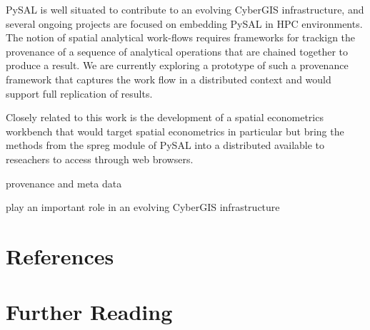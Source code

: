 \documentclass[11pt, titlepage]{article}
\begin{document}
PySAL is well situated to contribute to an evolving CyberGIS
infrastructure, and several ongoing projects are focused on embedding
PySAL in HPC environments. The notion of spatial analytical work-flows
requires frameworks for trackign the provenance of a sequence of
analytical operations that are chained together to produce a result. We
are currently exploring a prototype of such a provenance framework that
captures the work flow in a distributed context and would support full
replication of results.

Closely related to this work is the development of a spatial
econometrics workbench that would target spatial econometrics in
particular but bring the methods from the spreg module of PySAL into a
distributed available to reseachers to access through web browsers.

provenance and meta data

play an important role in an evolving CyberGIS infrastructure

\section{References}

\section{Further Reading}
\end{document}
